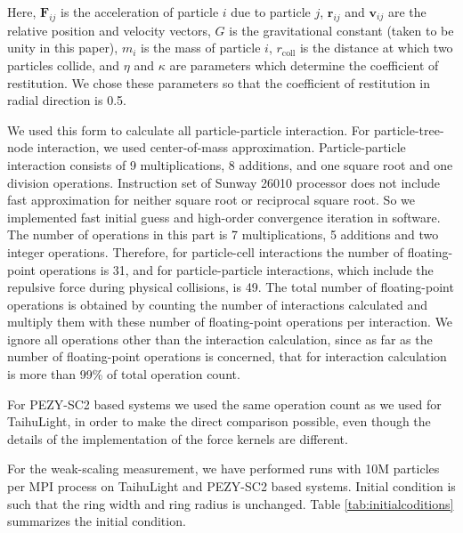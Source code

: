 \documentclass[conference]{IEEEtran}
\begin{document}
Here, ${\bm F_{ij}}$ is the acceleration of particle $i$ due to
particle $j$, ${\bm r_{ij}}$ and ${\bm v_{ij}}$ are the
relative position and velocity vectors, $G$ is the gravitational
constant (taken to be unity in this paper), $m_i$ is the mass of
particle $i$,  $r_\text{coll}$ is the distance at which
two particles collide, and $\eta$ and $\kappa$ are parameters which
determine the coefficient of restitution. We chose these parameters 
so that the coefficient of restitution in radial direction is 0.5.

We used this form to calculate all particle-particle interaction. For
particle-tree-node interaction, we used center-of-mass
approximation. Particle-particle interaction consists of 9
multiplications, 8 additions, and one square root and one division
operations. Instruction set of Sunway 26010 processor does not include
fast approximation for neither square root or reciprocal square
root. So we implemented fast initial guess and high-order
 convergence iteration in software. The number of
operations in this part is 7 multiplications, 5
additions and two integer operations. Therefore, for particle-cell interactions the number of
floating-point operations is 31, and for particle-particle
interactions, which include the repulsive force during physical
collisions, is 49.  The total number of floating-point operations is
obtained by counting the number of interactions calculated and
multiply them with these number of floating-point operations per
interaction. We ignore all operations other than the interaction
calculation, since as far as the number of floating-point operations is
concerned, that for interaction calculation is more than 99\% of total
operation count.

For PEZY-SC2 based systems we used the same operation count as we used
for TaihuLight, in order to make the direct comparison possible, even
though the details of the implementation of the force kernels are
different.

For the weak-scaling measurement, we have performed runs with 10M
particles per MPI process on TaihuLight and PEZY-SC2 based
systems. Initial condition is such that the ring width and ring radius
is unchanged. Table \ref{tab:initialcoditions} summarizes the initial
condition.
\end{document}
